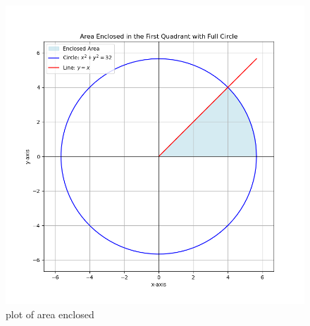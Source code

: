 \documentclass[journal]{IEEEtran}
\begin{document}
\begin{figure}[ht]
    \centering
    \includegraphics[width=\linewidth]{figs/9-9.2-41.png}
    \caption{plot of area enclosed}
    \label{fig:circle_plot}
\end{figure}
  
\end{document}
